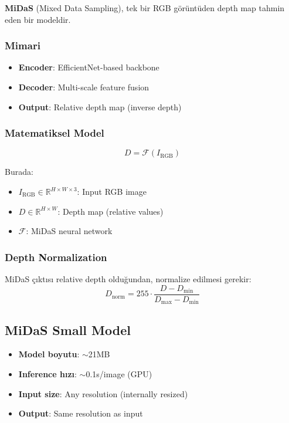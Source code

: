 \documentclass[12pt,a4paper]{article}
\begin{document}
\textbf{MiDaS} (Mixed Data Sampling), tek bir RGB görüntüden depth map tahmin eden bir modeldir.

\subsubsection{Mimari}
\begin{itemize}
    \item \textbf{Encoder}: EfficientNet-based backbone
    \item \textbf{Decoder}: Multi-scale feature fusion
    \item \textbf{Output}: Relative depth map (inverse depth)
\end{itemize}

\subsubsection{Matematiksel Model}
\begin{equation}
    D = \mathcal{F}(I_{\text{RGB}})
\end{equation}

Burada:
\begin{itemize}
    \item $I_{\text{RGB}} \in \mathbb{R}^{H \times W \times 3}$: Input RGB image
    \item $D \in \mathbb{R}^{H \times W}$: Depth map (relative values)
    \item $\mathcal{F}$: MiDaS neural network
\end{itemize}

\subsubsection{Depth Normalization}
MiDaS çıktısı relative depth olduğundan, normalize edilmesi gerekir:
\begin{equation}
    D_{\text{norm}} = 255 \cdot \frac{D - D_{\min}}{D_{\max} - D_{\min}}
\end{equation}

\subsection{MiDaS Small Model}

\begin{itemize}
    \item \textbf{Model boyutu}: $\sim$21MB
    \item \textbf{Inference hızı}: $\sim$0.1s/image (GPU)
    \item \textbf{Input size}: Any resolution (internally resized)
    \item \textbf{Output}: Same resolution as input
\end{itemize}
\end{document}
